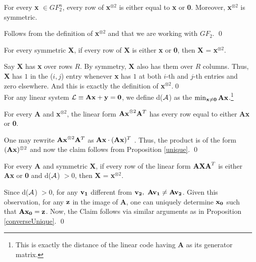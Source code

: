 {\begin{proposition}[Uniqueness]\label{unique}
For every {\bf x} $\in {GF}_2^n$, every row of {\bf x}$^{\otimes 2}$ is 
either equal to {\bf x} or {\bf 0}. Moreover, {\bf x}$^{\otimes 2}$ is symmetric.
\end{proposition}
 Follows from the definition of {\bf
  x}$^{\otimes 2}$ and that we are working with ${GF}_2$. \qed

\begin{proposition}\label{converseUnique}
  For every symmetric {\bf X}, if every row of {\bf X} is either {\bf
    x} or {\bf 0}, then {\bf X} = {\bf x}$^{\otimes 2}$.
\end{proposition}
 Say {\bf X} has {\bf x} over rows $R$. By
symmetry, {\bf X} also has them over $R$ columns. Thus, {\bf X} has
$1$ in the ($i,j$) entry whenever {\bf x} has $1$ at both $i$-th and
$j$-th entries and zero elsewhere. And this is exactly the definition
of {\bf x}$^{\otimes 2}$.\qed\\

\noindent For any linear system ${\cal L} \equiv {\bf Ax} + {\bf y} = {\bf 0}$, we define d(${\cal A}$) as
the $\min_{{\bf x} \ne {\bf 0}} {\bf Ax}$.\footnote{This is exactly
  the distance of the linear code having {\bf A} as its generator
  matrix.}

\begin{claim}
  For every {\bf A} and {\bf x}$^{\otimes 2}$, the linear form ${\bf
    Ax}^{\otimes 2}{\bf A}^T$ has every row equal to either {\bf Ax}
  or {\bf 0}.
\end{claim}
 One may rewrite ${\bf Ax}^{\otimes 2}{\bf A}^T$  as 
${\bf Ax}\cdot ({\bf Ax})^T$ . Thus, the product is of the form $({\bf  Ax})^{\otimes 2}$ 
and now the claim follows from Proposition \ref{unique}. \qed



\begin{claim} \label{NonUnique}
For every {\bf A} and symmetric {\bf X}, if every row of the linear 
form ${\bf AXA}^T$ is either {\bf Ax} or {\bf 0} and d(${\cal A}$) $ > 0$, then 
{\bf X} = {\bf x}$^{\otimes 2}$.
\end{claim}
 Since d(${\cal A}$) $> 0$, for any ${\bf v_1}$ different from ${\bf v_2},\ {\bf Av_1} \ne {\bf Av_2}$. 
Given this observation, for any ${\bf z}$ in the image of {\bf A}, one
can uniquely determine ${\bf x_0}$ such that ${\bf Ax_0} = {\bf z}$. 
Now, the Claim follows via similar arguments as in Proposition 
\ref{converseUnique}. \qed\\

}
